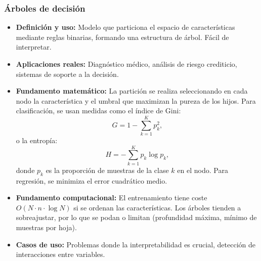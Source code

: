 \documentclass[12pt,a4paper,openany,oneside]{book}
\begin{document}
\subsubsection{Árboles de decisión}
\begin{itemize}
    \item \textbf{Definición y uso:} Modelo que particiona el espacio de características mediante reglas binarias, formando una estructura de árbol. Fácil de interpretar.
    \item \textbf{Aplicaciones reales:} Diagnóstico médico, análisis de riesgo crediticio, sistemas de soporte a la decisión.
    \item \textbf{Fundamento matemático:} La partición se realiza seleccionando en cada nodo la característica y el umbral que maximizan la pureza de los hijos. Para clasificación, se usan medidas como el índice de Gini:
    \[
    G = 1 - \sum_{k=1}^K p_k^2,
    \]
    o la entropía:
    \[
    H = -\sum_{k=1}^K p_k \log p_k,
    \]
    donde \(p_k\) es la proporción de muestras de la clase \(k\) en el nodo. Para regresión, se minimiza el error cuadrático medio.
    \item \textbf{Fundamento computacional:} El entrenamiento tiene coste \(O(N \cdot n \cdot \log N)\) si se ordenan las características. Los árboles tienden a sobreajustar, por lo que se podan o limitan (profundidad máxima, mínimo de muestras por hoja).
    \item \textbf{Casos de uso:} Problemas donde la interpretabilidad es crucial, detección de interacciones entre variables.
\end{itemize}
\end{document}
